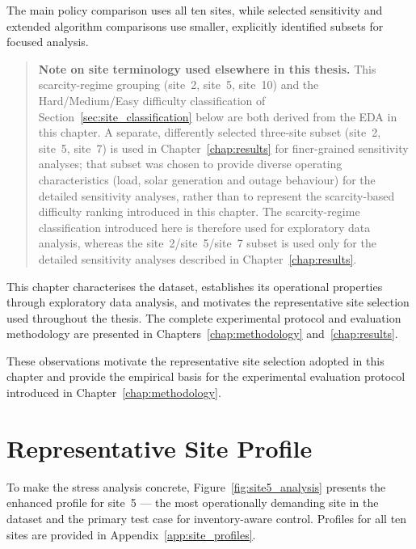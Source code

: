 The main policy comparison uses all ten sites,
while selected sensitivity and extended algorithm
comparisons use smaller, explicitly identified
subsets for focused analysis.

\begin{quote}
\textbf{Note on site terminology used elsewhere in this thesis.} This
scarcity-regime grouping (site~2, site~5, site~10) and the Hard/Medium/Easy
difficulty classification of Section~\ref{sec:site_classification} below
are both derived from the EDA in this chapter. A separate, differently
selected three-site subset (site~2, site~5, site~7) is used in
Chapter~\ref{chap:results} for finer-grained sensitivity analyses; that
subset was chosen to provide diverse operating characteristics (load,
solar generation and outage behaviour) for the detailed sensitivity
analyses, rather than to represent the scarcity-based difficulty ranking
introduced in this chapter. The scarcity-regime classification introduced here is therefore used for
exploratory data analysis, whereas the site~2/site~5/site~7 subset is
used only for the detailed sensitivity analyses described in
Chapter~\ref{chap:results}.
\end{quote}

This chapter characterises the dataset, establishes its operational
properties through exploratory data analysis, and motivates the
representative site selection used throughout the thesis. The complete experimental protocol and evaluation methodology are
presented in Chapters~\ref{chap:methodology}
and~\ref{chap:results}.

These observations motivate the representative site selection adopted in
this chapter and provide the empirical basis for the experimental
evaluation protocol introduced in
Chapter~\ref{chap:methodology}.

\section{Representative Site Profile}
\label{sec:site_profiles}

To make the stress analysis concrete, Figure~\ref{fig:site5_analysis}
presents the enhanced profile for site~5 --- the most operationally
demanding site in the dataset and the primary test case for
inventory-aware control.  Profiles for all ten sites are provided in
Appendix~\ref{app:site_profiles}.

